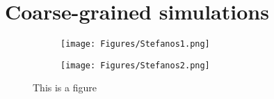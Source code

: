 \section{Coarse-grained simulations}

\begin{figure}[ht]
  \begin{centering}
  \begin{subfigure}[t]{\dimexpr.4\linewidth-1.3em\relax}
  \centering
  \texttt{[image: Figures/Stefanos1.png]}
  \end{subfigure}%
  \begin{subfigure}[t]{\dimexpr.5\linewidth-1.3em\relax}
  \centering
  \texttt{[image: Figures/Stefanos2.png]}
  \end{subfigure}
  \caption{This is a figure}
  \label{fig:test}
  \end{centering}
\end{figure}

